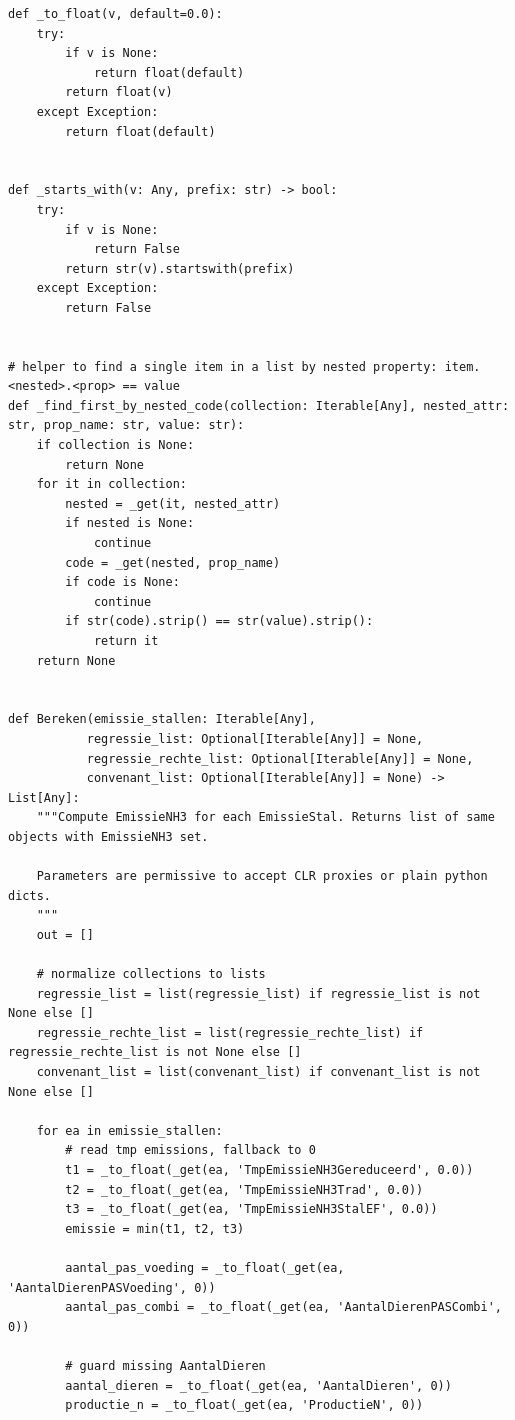 \begin{verbatim}
def _to_float(v, default=0.0):
    try:
        if v is None:
            return float(default)
        return float(v)
    except Exception:
        return float(default)


def _starts_with(v: Any, prefix: str) -> bool:
    try:
        if v is None:
            return False
        return str(v).startswith(prefix)
    except Exception:
        return False


# helper to find a single item in a list by nested property: item.<nested>.<prop> == value
def _find_first_by_nested_code(collection: Iterable[Any], nested_attr: str, prop_name: str, value: str):
    if collection is None:
        return None
    for it in collection:
        nested = _get(it, nested_attr)
        if nested is None:
            continue
        code = _get(nested, prop_name)
        if code is None:
            continue
        if str(code).strip() == str(value).strip():
            return it
    return None


def Bereken(emissie_stallen: Iterable[Any],
           regressie_list: Optional[Iterable[Any]] = None,
           regressie_rechte_list: Optional[Iterable[Any]] = None,
           convenant_list: Optional[Iterable[Any]] = None) -> List[Any]:
    """Compute EmissieNH3 for each EmissieStal. Returns list of same objects with EmissieNH3 set.

    Parameters are permissive to accept CLR proxies or plain python dicts.
    """
    out = []

    # normalize collections to lists
    regressie_list = list(regressie_list) if regressie_list is not None else []
    regressie_rechte_list = list(regressie_rechte_list) if regressie_rechte_list is not None else []
    convenant_list = list(convenant_list) if convenant_list is not None else []

    for ea in emissie_stallen:
        # read tmp emissions, fallback to 0
        t1 = _to_float(_get(ea, 'TmpEmissieNH3Gereduceerd', 0.0))
        t2 = _to_float(_get(ea, 'TmpEmissieNH3Trad', 0.0))
        t3 = _to_float(_get(ea, 'TmpEmissieNH3StalEF', 0.0))
        emissie = min(t1, t2, t3)

        aantal_pas_voeding = _to_float(_get(ea, 'AantalDierenPASVoeding', 0))
        aantal_pas_combi = _to_float(_get(ea, 'AantalDierenPASCombi', 0))

        # guard missing AantalDieren
        aantal_dieren = _to_float(_get(ea, 'AantalDieren', 0))
        productie_n = _to_float(_get(ea, 'ProductieN', 0))


\end{verbatim}
